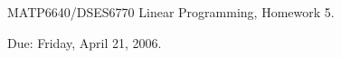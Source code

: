 \documentclass[12pt]{article}
\begin{document}
\begin{center}
  \begin{large}
     MATP6640/DSES6770 Linear Programming, Homework 5.
  \end{large}
\end{center}

\begin{flushright}
   Due:  Friday, April 21, 2006.
\end{flushright}



\end{document}
